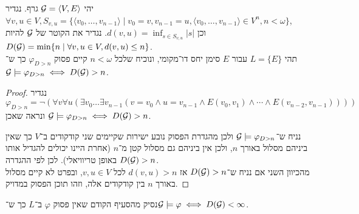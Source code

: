 \subquestion{}
יהי $\mathcal{G} = \langle V, E \rangle$ גרף.
נגדיר $\forall v, u \in V, S_{v, u} = \{ \langle v_0, \dots, v_{n - 1} \rangle \mid v_0 = v, v_{n - 1} = u, \langle v_0, \dots, v_{n - 1} \rangle \in V^n, n < \omega \}$, \\
וכן $d(v, u) = \inf_{s \in S_{v, u}} |s|$.
נגדיר את הקוטר של $\mathcal{G}$ להיות $D(\mathcal{G}) = \min \{ n \mid \forall v, u \in V, d(v, u) \le n \}$. \\
תהי $L = \{ E \}$ עבור $E$ סימן יחס דו־מקומי, ונוכיח שלכל $n < \omega$ קיים פסוק $\varphi_{D > n}$ כך ש־$\mathcal{G} \models \varphi_{D > n} \iff D(\mathcal{G}) > n$.
\begin{proof}
	נגדיר
	\[
		\varphi_{D > n}
		= \lnot (\forall v \forall u (\exists v_0 \dots \exists v_{n - 1} (v = v_0 \land u = v_{n - 1} \land E(v_0, v_1) \land \cdots \land E(v_{n - 2}, v_{n - 1}))))
	\]
	ונראה שאכן $\mathcal{G} \models \varphi_{D > n} \iff D(\mathcal{G}) > n$.

	נניח ש־$\mathcal{G} \models \varphi_{D > n}$ ולכן מהגדרת הפסוק נובע ישירות שקיימים שני קודקודים ב־$V$ כך שאין ביניהם מסלול באורך $n$, ולכן אין ביניהם גם מסלול קטן מ־$n$ (אחרת היינו יכולים להגדיל אותו באופן טריוויאלי).
	לכן לפי ההגדרה $D(\mathcal{G}) > n$. \\
	מהכיוון השני אם נניח ש־$D(\mathcal{G}) > n$ אז $d(v, u) > n$ לכל $v, u \in V$, ובפרט לא קיים מסלול באורך $n$ בין קודקודים אלה, וזהו תוכן הפסוק במדויק.
\end{proof}

\subquestion{}
נסיק מהסעיף הקודם שאין פסוק $\varphi$ ב־$L$ כך ש־$\mathcal{G} \models \varphi \iff D(\mathcal{G}) < \infty$.


